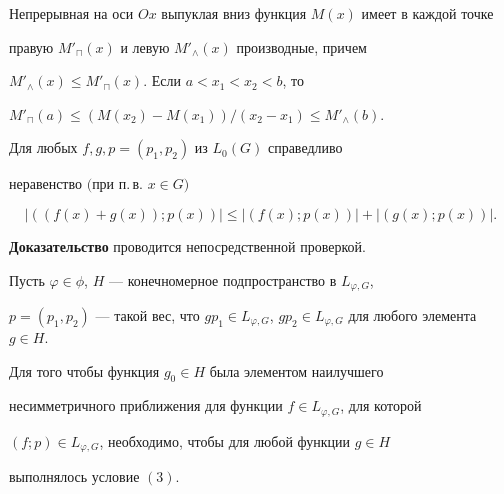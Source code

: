  


 


\begin{lem} 


Непрерывная на оси $Ox$ выпуклая вниз функция $M(x)$ имеет в каждой точке 


правую $M'_\sqcap(x)$ и левую $M'_\wedge(x)$ производные, причем 


$M'_\wedge(x)\le M'_\sqcap(x)$. Если $a<x_1<x_2<b$, то 


$M'_\sqcap(a)\le(M(x_2)-M(x_1))/ (x_2-x_1)\le M'_\wedge(b)$. 


\end{lem} 


 


 


\begin{lem} 


Для любых $f,g,p=(p_1,p_2)$ из $L_0(G)$ справедливо 


неравенство $($при п.\,в. $x\in G)$ 


$$ 


|((f(x)+g(x));p(x))|\le|(f(x);p(x))|+|(g(x);p(x))|. 


$$ 


\end{lem} 


 


{\bf Доказательство} проводится непосредственной проверкой. 


 


 


\begin{lem} 


Пусть $\varphi\in\phi$, $H$ --- конечномерное подпространство в $L_{\varphi,G}$, 


$p=(p_1,p_2)$ --- такой вес, что $gp_1\in L_{\varphi,G}$, $gp_2\in 


L_{\varphi,G}$ для любого элемента $g\in H$. 


 


Для того чтобы функция $g_0\in H$ была элементом наилучшего 


несимметричного приближения для функции $f\in L_{\varphi,G}$, для которой 


$(f;p)\in L_{\varphi,G}$, необходимо, чтобы для любой функции $g\in H$ 


выполнялось условие $(3)$. 


\end{lem} 


